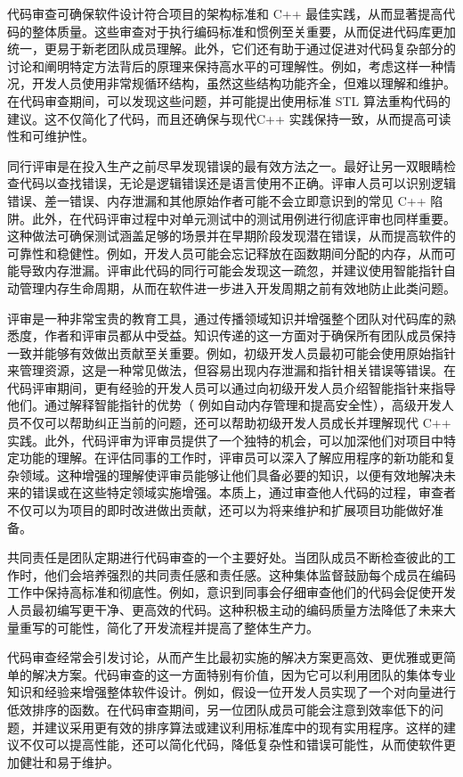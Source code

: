 代码审查可确保软件设计符合项目的架构标准和 C++ 最佳实践，从而显著提高代码的整体质量。这些审查对于执行编码标准和惯例至关重要，从而促进代码库更加统一，更易于新老团队成员理解。此外，它们还有助于通过促进对代码复杂部分的讨论和阐明特定方法背后的原理来保持高水平的可理解性。例如，考虑这样一种情况，开发人员使用非常规循环结构，虽然这些结构功能齐全，但难以理解和维护。在代码审查期间，可以发现这些问题，并可能提出使用标准 STL 算法重构代码的建议。这不仅简化了代码，而且还确保与现代C++ 实践保持一致，从而提高可读性和可维护性。

同行评审是在投入生产之前尽早发现错误的最有效方法之一。最好让另一双眼睛检查代码以查找错误，无论是逻辑错误还是语言使用不正确。评审人员可以识别逻辑错误、差一错误、内存泄漏和其他原始作者可能不会立即意识到的常见 C++ 陷阱。此外，在代码评审过程中对单元测试中的测试用例进行彻底评审也同样重要。这种做法可确保测试涵盖足够的场景并在早期阶段发现潜在错误，从而提高软件的可靠性和稳健性。例如，开发人员可能会忘记释放在函数期间分配的内存，从而可能导致内存泄漏。评审此代码的同行可能会发现这一疏忽，并建议使用智能指针自动管理内存生命周期，从而在软件进一步进入开发周期之前有效地防止此类问题。

评审是一种非常宝贵的教育工具，通过传播领域知识并增强整个团队对代码库的熟悉度，作者和评审员都从中受益。知识传递的这一方面对于确保所有团队成员保持一致并能够有效做出贡献至关重要。例如，初级开发人员最初可能会使用原始指针来管理资源，这是一种常见做法，但容易出现内存泄漏和指针相关错误等错误。在代码评审期间，更有经验的开发人员可以通过向初级开发人员介绍智能指针来指导他们。通过解释智能指针的优势（ 例如自动内存管理和提高安全性），高级开发人员不仅可以帮助纠正当前的问题，还可以帮助初级开发人员成长并理解现代 C++ 实践。此外，代码评审为评审员提供了一个独特的机会，可以加深他们对项目中特定功能的理解。在评估同事的工作时，评审员可以深入了解应用程序的新功能和复杂领域。这种增强的理解使评审员能够让他们具备必要的知识，以便有效地解决未来的错误或在这些特定领域实施增强。本质上，通过审查他人代码的过程，审查者不仅可以为项目的即时改进做出贡献，还可以为将来维护和扩展项目功能做好准备。

共同责任是团队定期进行代码审查的一个主要好处。当团队成员不断检查彼此的工作时，他们会培养强烈的共同责任感和责任感。这种集体监督鼓励每个成员在编码工作中保持高标准和彻底性。例如，意识到同事会仔细审查他们的代码会促使开发人员最初编写更干净、更高效的代码。这种积极主动的编码质量方法降低了未来大量重写的可能性，简化了开发流程并提高了整体生产力。

代码审查经常会引发讨论，从而产生比最初实施的解决方案更高效、更优雅或更简单的解决方案。代码审查的这一方面特别有价值，因为它可以利用团队的集体专业知识和经验来增强整体软件设计。例如，假设一位开发人员实现了一个对向量进行低效排序的函数。在代码审查期间，另一位团队成员可能会注意到效率低下的问题，并建议采用更有效的排序算法或建议利用标准库中的现有实用程序。这样的建议不仅可以提高性能，还可以简化代码，降低复杂性和错误可能性，从而使软件更加健壮和易于维护。



